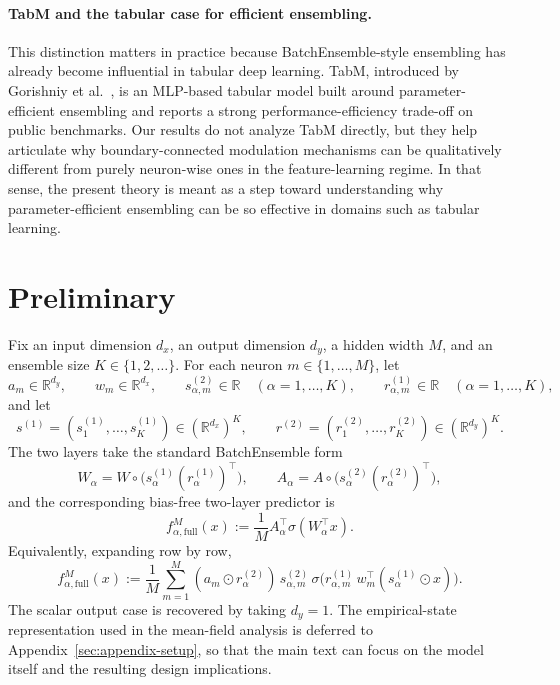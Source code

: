 \documentclass[11pt]{article}
\theoremstyle{definition}
\newcommand{\R}{\mathbb{R}}
\begin{document}
\paragraph{TabM and the tabular case for efficient ensembling.}
This distinction matters in practice because BatchEnsemble-style ensembling has
already become influential in tabular deep learning. TabM, introduced by
Gorishniy et al.\ \cite{gorishniy2025}, is an MLP-based tabular model built
around parameter-efficient ensembling and reports a strong
performance-efficiency trade-off on public benchmarks. Our results do not
analyze TabM directly, but they help articulate why boundary-connected
modulation mechanisms can be qualitatively different from purely neuron-wise
ones in the feature-learning regime. In that sense, the present theory is
meant as a step toward understanding why parameter-efficient ensembling can be
so effective in domains such as tabular learning.

\section{Preliminary}
\label{sec:prelim}

Fix an input dimension $d_x$, an output dimension $d_y$, a hidden width $M$, and an ensemble size
$K\in\{1,2,\dots\}$. For each neuron $m\in\{1,\dots,M\}$, let
\[
  a_m\in\R^{d_y},\qquad
  w_m\in\R^{d_x},\qquad
  s_{\alpha,m}^{(2)}\in\R\quad (\alpha=1,\dots,K),\qquad
  r_{\alpha,m}^{(1)}\in\R\quad (\alpha=1,\dots,K),
\]
and let
\[
  s^{(1)}=(s_1^{(1)},\dots,s_K^{(1)})\in(\R^{d_x})^K,
  \qquad
  r^{(2)}=(r_1^{(2)},\dots,r_K^{(2)})\in(\R^{d_y})^K.
\]
The two layers take the standard BatchEnsemble form
\[
  W_\alpha = W\circ \bigl(s_\alpha^{(1)}(r_\alpha^{(1)})^\top\bigr),
  \qquad
  A_\alpha = A\circ \bigl(s_\alpha^{(2)}(r_\alpha^{(2)})^\top\bigr),
\]
and the corresponding bias-free two-layer predictor is
\begin{equation}
  f_{\alpha,\mathrm{full}}^M(x)
  :=
  \frac1M A_\alpha^\top \sigma(W_\alpha^\top x).
  \label{eq:model-full-matrix}
\end{equation}
Equivalently, expanding row by row,
\begin{equation}
  f_{\alpha,\mathrm{full}}^M(x)
  :=
  \frac1M\sum_{m=1}^M
  (a_m\odot r_\alpha^{(2)})\,s_{\alpha,m}^{(2)}\,
  \sigma\!\bigl(
    r_{\alpha,m}^{(1)}\,w_m^\top(s_\alpha^{(1)}\odot x)
  \bigr).
  \label{eq:model-full}
\end{equation}
The scalar output case is recovered by taking $d_y=1$.
The empirical-state representation used in the mean-field analysis is deferred
to Appendix~\ref{sec:appendix-setup}, so that the main text can focus on the
model itself and the resulting design implications.
\end{document}
